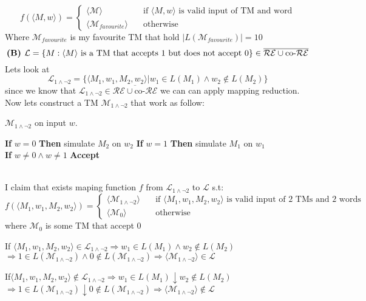 \documentclass[12pt]{article}
\begin{document}
\[
f(\langle M,w\rangle)=\begin{cases} 
     \langle \mathcal{M} \rangle  &\quad\text{if  }\langle M,w\rangle \text{ is valid input  of TM and word} \\
    \langle \mathcal{M}_{favourite} \rangle  &\quad\text{otherwise  } \end{cases} 
\]
Where  $\mathcal{M}_{favourite}$ is my favourite TM that hold $|L(\mathcal{M}_{favourite})|=10$
\\\hrulefill
     \pagebreak
\[ \text{\textbf{(B) }}\mathcal{L} = \{ M : \langle M\rangle \text{ is a TM that accepts 1 but does not accept 0}\} \in \overline{\mathcal{RE}\cup\text{co-} \mathcal{RE}}
\]
Lets look at \[ \mathcal{L}_{1\wedge\neg 2}=\{ \langle M_1,w_1,M_2,w_2\rangle | w_1 \in L(M_1) \wedge w_2 \notin L(M_2)\} \]
since we know that $\mathcal{L}_{1\wedge\neg 2}\in \overline{\mathcal{RE}\cup\text{co-}\mathcal{RE}}$ we can can apply mapping reduction. Now lets construct a TM $\mathcal{M}_{1\wedge\neg 2}$ that work as follow:
\begin{algorithm}
\caption{ $\mathcal{M}_{1\wedge\neg 2}$ on input $w$. }\label{alg:cap}
\begin{algorithmic}
\State \textbf{If} $w=0$ \textbf{Then} simulate $M_2$ on $w_2$
\State \textbf{If} $w=1$ \textbf{Then} simulate $M_1$ on $w_1$
\\ \textbf{If} $w\neq 0\wedge w\neq 1$ \textbf{Accept}
\end{algorithmic}
\end{algorithm}
\\I claim that exists maping function $f$ from $\mathcal{L}_{1\wedge\neg 2}$ to $\mathcal{L}$   s.t:\[
f(\langle M_1,w_1,M_2,w_2\rangle)=\begin{cases} 
     \langle \mathcal{M}_{1\wedge\neg 2} \rangle  &\quad\text{if  }\langle M_1,w_1,M_2,w_2\rangle \text{ is valid input  of 2 TMs and 2 words} \\
    \langle \mathcal{M}_{0} \rangle  &\quad\text{otherwise  } \end{cases} 
\]
where  $\mathcal{M}_{0}$ is some TM that accept 0 
\begin{list}{•}{}
\item If $\langle M_1,w_1,M_2,w_2\rangle \in \mathcal{L}_{1\wedge\neg 2}\Rightarrow w_1 \in L(M_1) \wedge w_2 \notin L(M_2)$\\$\Rightarrow 1\in L(\mathcal{M}_{1\wedge\neg 2}) \wedge 0 \notin L(\mathcal{M}_{1\wedge\neg 2})\Rightarrow\langle\mathcal{M}_{1\wedge\neg 2}\rangle \in \mathcal{L} $
\item If$\langle M_1,w_1,M_2,w_2\rangle \notin \mathcal{L}_{1\wedge\neg 2}\Rightarrow w_1 \in L(M_1) \downarrow w_2 \notin L(M_2)$\\$\Rightarrow 1\in L(\mathcal{M}_{1\wedge\neg 2}) \downarrow 0 \notin L(\mathcal{M}_{1\wedge\neg 2})\Rightarrow\langle\mathcal{M}_{1\wedge\neg 2}\rangle \notin \mathcal{L} $
\end{list}
\end{document}
